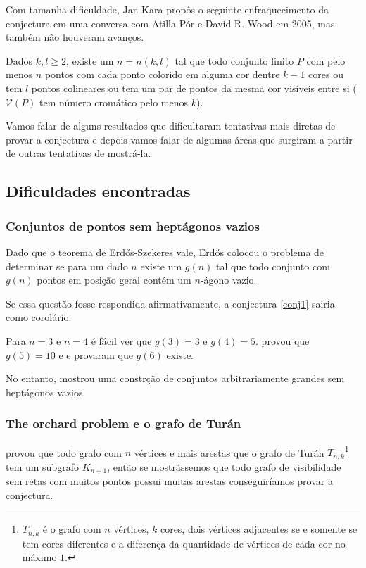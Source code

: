 Com tamanha dificuldade, Jan Kara propôs o seguinte enfraquecimento da conjectura em uma conversa com Atilla Pór e David R. Wood em 2005, mas também não houveram avanços.
\begin{conjectura}
    Dados $k,l\geq 2$, existe um $n=n(k,l)$ tal que todo conjunto finito $P$ com pelo menos $n$ pontos com cada ponto colorido em alguma cor dentre $k-1$ cores ou tem $l$ pontos colineares ou tem um par de pontos da mesma cor visíveis entre si ($\mathcal V(P)$ tem número cromático pelo menos $k$).
\end{conjectura}

Vamos falar de alguns resultados que dificultaram tentativas mais diretas de provar a conjectura e depois vamos falar de algumas áreas que surgiram a partir de outras tentativas de mostrá-la.
\subsection{Dificuldades encontradas}

\subsubsection{Conjuntos de pontos sem heptágonos vazios}
Dado que o teorema de Erd\H os-Szekeres vale, Erd\H os colocou o problema de determinar se para um dado $n$ existe um $g(n)$ tal que todo conjunto com $g(n)$ pontos em posição geral contém um $n$-ágono vazio.

Se essa questão fosse respondida afirmativamente, a conjectura \ref{conj1} sairia como corolário.

Para $n=3$ e $n=4$ é fácil ver que $g(3)=3$ e $g(4)=5$. \cite{Harborth1978} provou que $g(5)=10$ e \cite{Gerken} e \cite{Nicolas} provaram que $g(6)$ existe.

No entanto, \cite{heptagon} mostrou uma constrção de conjuntos arbitrariamente grandes sem heptágonos vazios.

\subsubsection{The orchard problem e o grafo de Turán}
\cite{Turan} provou que todo grafo com $n$ vértices e mais arestas que o grafo de Turán $T_{n,k}$\footnote{$T_{n,k}$ é o grafo com $n$ vértices, $k$ cores, dois vértices adjacentes se e somente se tem cores diferentes e a diferença da quantidade de vértices de cada cor no máximo $1$.} tem um subgrafo $K_{n+1}$, então se mostrássemos que todo grafo de visibilidade sem retas com muitos pontos possui muitas arestas conseguiríamos provar a conjectura.

